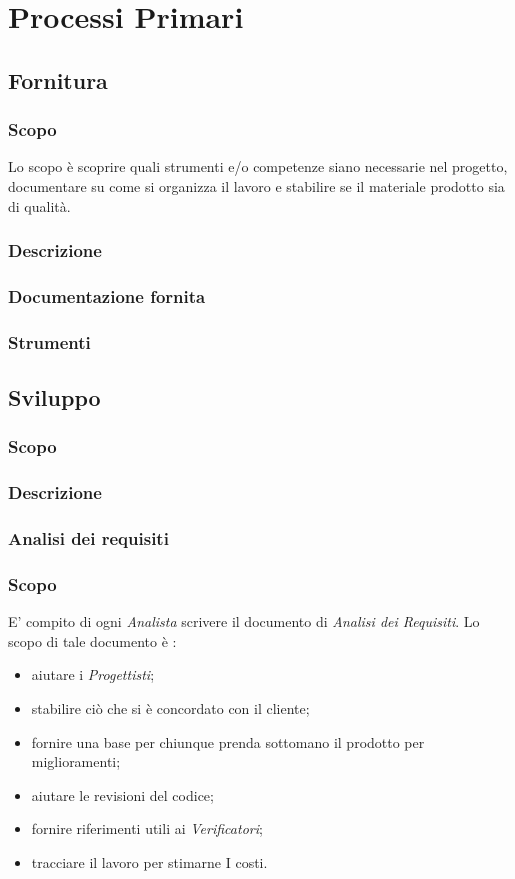 \section{Processi Primari}
\subsection{Fornitura}
\subsubsection{Scopo}
Lo scopo è scoprire quali strumenti e/o competenze siano necessarie nel progetto, documentare su come si organizza il lavoro e stabilire se il materiale prodotto sia di qualità.

\subsubsection{Descrizione}
\subsubsection{Documentazione fornita}
\subsubsection{Strumenti}

\subsection{Sviluppo}
\subsubsection{Scopo}
\subsubsection{Descrizione}
\subsubsection{Analisi dei requisiti}
\subsubsection{Scopo}
E’ compito di ogni \textit{Analista} scrivere il documento di \textit{Analisi dei Requisiti}. Lo scopo di tale documento è :
\begin{itemize}
  \item aiutare i \textit{Progettisti};
  \item stabilire ciò che si è concordato con il cliente;
  \item fornire una base per chiunque prenda sottomano il prodotto per miglioramenti;
  \item aiutare le revisioni del codice;
  \item fornire riferimenti utili ai \textit{Verificatori};
  \item tracciare il lavoro per stimarne I costi.
\end{itemize}

